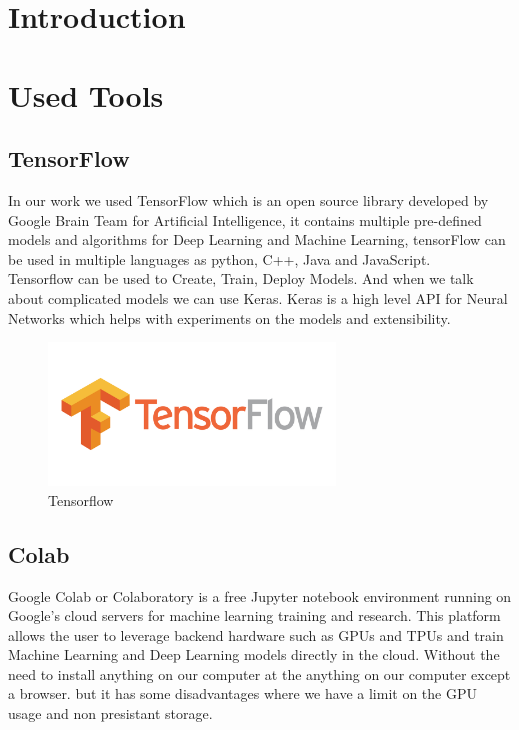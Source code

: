 \section{Introduction}
\vspace{0.2in}
\hspace*{0.16in}

\section{Used Tools}
\subsection{TensorFlow}
In our work we used TensorFlow which is an open source library developed by Google Brain Team for Artificial Intelligence, it contains multiple pre-defined models and algorithms for Deep Learning and Machine Learning, tensorFlow can be used in multiple languages as python, C++, Java and JavaScript.\\
Tensorflow can be used to Create, Train, Deploy Models. And when we talk about complicated models we can use Keras.
Keras is a high level API for Neural Networks which helps with experiments on the models and extensibility.

\begin{figure}[H]
    \centering
      \vspace{-0.1in}
        \centerline{\includegraphics[width = 3in]{../images/tensorflow.png}}
        \caption{Tensorflow}
        \label{Tensorflow}
    \end{figure}

\subsection{Colab}
Google Colab or Colaboratory is a free Jupyter notebook environment running on Google's cloud servers for machine learning training and research. This platform allows the user to leverage backend hardware such as GPUs and TPUs and train Machine Learning and Deep Learning models directly in the cloud. Without the need to install anything on our computer at the anything on our computer except a browser.
but it has some disadvantages where we have a limit on the GPU usage
and non presistant storage.

